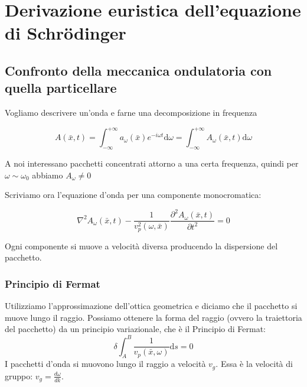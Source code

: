 

%
\chapter[Derivazione euristica]{Derivazione euristica dell'equazione di Schrödinger} %
\section[Confronto ondulatoria-particellare]{Confronto della meccanica ondulatoria con quella particellare} %
Vogliamo descrivere un'onda e farne una decomposizione in frequenza

\[
A\left(\bar x, t\right)=\int_{-\infty }^{+\infty }{a_{\omega}(\bar x)e^{-i\omega t} \textrm{d}\omega}=\int_{-\infty}^{+\infty}{A_\omega(\bar x,t) \textrm{d}\omega}
\]

A noi interessano pacchetti concentrati attorno a una certa frequenza, quindi per $\omega\sim\omega_0$ abbiamo $A_\omega\neq0$


Scriviamo ora l'equazione d'onda per una componente monocromatica:

\begin{equation}
\nabla ^2A_{\omega }\left(\bar x, t\right)-\frac{1}{v^2_p (\omega,\bar x)}\frac{\partial ^2A_{\omega }\left(\bar x, t\right)}{\partial t^2}=0
\end{equation}

Ogni componente si muove a velocità diversa producendo la dispersione del pacchetto.

\subsection{Principio di Fermat} %
Utilizziamo l'approssimazione dell'ottica geometrica e diciamo che il pacchetto si muove lungo il raggio.
Possiamo ottenere la forma del raggio (ovvero la traiettoria del pacchetto) da un principio variazionale, che è il Principio di Fermat:
\begin{equation}
\delta \int_{A}^{B}{\frac{1}{v_p(\bar x,\omega)} \textrm{d}s=0}
\end{equation}
I pacchetti d'onda si muovono lungo il raggio a velocità $v_g$. Essa è la velocità di gruppo: $v_g=\frac{d\omega}{dk}$.

